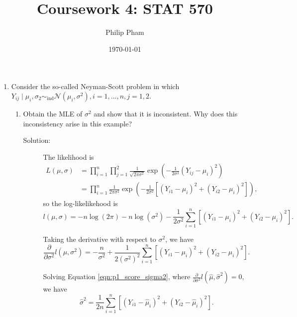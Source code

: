 \documentclass[letterpaper,11pt]{article}
\title{Coursework 4: STAT 570}
\author{Philip Pham}
\date{\today}
\begin{document}
\maketitle

\begin{enumerate}
\item Consider the so-called Neyman-Scott problem in which
  $Y_{ij}\mid \mu_i,\sigma_2 \sim_{\mathrm{ind}}
  \mathcal{N}\left(\mu_i,\sigma^2\right), i=1,\ldots,n,j=1,2.$
  \begin{enumerate}
  \item Obtain the MLE of $\sigma^2$ and show that it is inconsistent. Why does
    this inconsistency arise in this example?

    \begin{description}
    \item[Solution:] The likelihood is
      \begin{align}
        L\left(\mu,\sigma\right)
        &= \prod_{i=1}^n \prod_{j=1}^2 \frac{1}{\sqrt{2\pi\sigma^2}}\exp\left(
          -\frac{1}{2\sigma^2}\left(Y_{ij} - \mu_i\right)^2
          \right) \nonumber\\
        &= \prod_{i=1}^n \frac{1}{2\pi\sigma^2}\exp\left(
          -\frac{1}{2\sigma^2}\left[
          \left(Y_{i1} - \mu_i\right)^2
          +\left(Y_{i2} - \mu_i\right)^2
          \right]
          \right),
          \label{eqn:p1_likelihood}
      \end{align}
      so the log-likelikehood is
      \begin{equation}
        l\left(\mu,\sigma\right) = -n\log\left(2\pi\right) -n\log\left(\sigma^2\right)
        - \frac{1}{2\sigma^2}\sum_{i=1}^n\left[
          \left(Y_{i1} - \mu_i\right)^2
          +\left(Y_{i2} - \mu_i\right)^2\right].
        \label{eqn:p1_log_likelihood}
      \end{equation}

      Taking the derivative with respect to $\sigma^2$, we have
      \begin{equation}
        \frac{\partial}{\partial\sigma^2}l\left(\mu, \sigma^2\right)
          = -\frac{n}{\sigma^2} +
          \frac{1}{2\left(\sigma^2\right)^2}\sum_{i=1}^n
          \left[
            \left(Y_{i1} - \mu_i\right)^2 +
            \left(Y_{i2} - \mu_i\right)^2\right].
          \label{eqn:p1_score_sigma2}
        \end{equation}

        Solving Equation \ref{eqn:p1_score_sigma2}, where
        $\frac{\partial}{\partial\sigma^2}l\left(\hat{\mu},
          \hat{\sigma}^2\right) = 0$, we have
        \begin{equation}
          \hat{\sigma}^2 = \frac{1}{2n}\sum_{i=1}^n
          \left[
            \left(Y_{i1} - \hat{\mu}_i\right)^2 +
            \left(Y_{i2} - \hat{\mu}_i\right)^2\right].
          \label{eqn:p1_sigma_hat}
        \end{equation}


\end{description}
\end{enumerate}
\end{enumerate}
\end{document}
